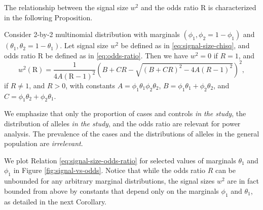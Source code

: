 The relationship between the signal size $w^2$ and the odds ratio $\text{R}$ is characterized in the following Proposition.

\begin{proposition} \label{prop:signal-size-odds-ratio}
Consider 2-by-2 multinomial distribution with marginals $(\phi_1, \phi_2 = 1-\phi_1)$ and $(\theta_1, \theta_2 = 1-\theta_1)$.
Let signal size $w^2$ be defined as in \eqref{eq:signal-size-chisq}, and odds ratio $\text{R}$ be defined as in \eqref{eq:odds-ratio}. 
Then we have $w^2 = 0$ if $R=1$, and
\begin{equation} \label{eq:signal-size-odds-ratio}
    w^2(\text{R}) =
    \frac{1}{4A(\text{R}-1)^2}\left(B+CR-\sqrt{(B+CR)^2-4A(R-1)^2}\right)^2,
\end{equation}
if $R\neq1$, and $R>0$, 
with constants $A = \phi_1\theta_1\phi_2\theta_2$, $B = \phi_1\theta_1+\phi_2\theta_2$, and $C = \phi_1\theta_2+\phi_2\theta_1$.
\end{proposition}

We emphasize that only the proportion of cases and controls \emph{in the study}, the distribution of alleles \emph{in the study}, and the odds ratio are relevant for power analysis.
The prevalence of the cases and the distributions of alleles in the general population are \emph{irrelevant}.

We plot Relation \eqref{eq:signal-size-odds-ratio} for selected values of marginals $\theta_1$ and $\phi_1$ in Figure \ref{fig:signal-vs-odds}.
Notice that while the odds ratio $R$ can be unbounded for any arbitrary marginal distributions, the signal sizes $w^2$ are in fact bounded from above by constants that depend only on the marginals $\phi_1$ and $\theta_1$, as detailed in the next Corollary.

